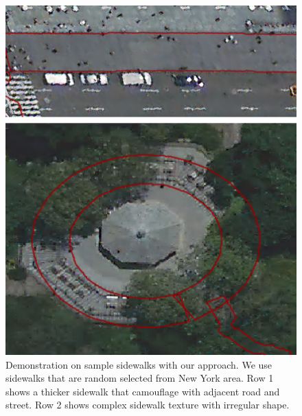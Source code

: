 \begin{figure}
    \centering
    \includegraphics[width=\textwidth]{Figures/ny2.png}
    \caption[Sample Sidewalk 5]{Demonstration on sample sidewalks with our approach. We use sidewalks that are random selected from New York area. Row 1 shows a thicker sidewalk that camouflage with adjacent road and street. Row 2 shows complex sidewalk texture with irregular shape.}
    \label{fig:ny2}
\end{figure}

